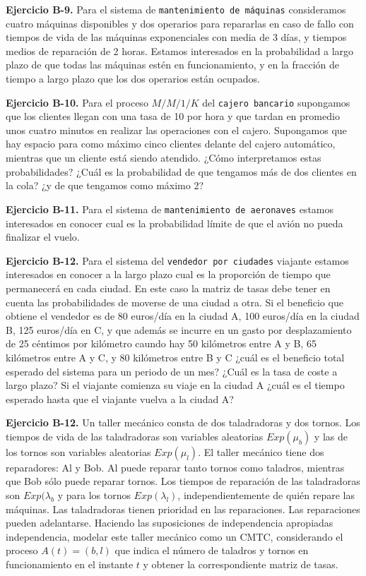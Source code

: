 \documentclass[
]{book}
\theoremstyle{definition}
\theoremstyle{definition}
\theoremstyle{definition}
\theoremstyle{definition}
\theoremstyle{remark}
\begin{document}
\textbf{Ejercicio B-9.} Para el sistema de \texttt{mantenimiento\ de\ máquinas} consideramos cuatro máquinas disponibles y dos operarios para repararlas en caso de fallo con tiempos de vida de las máquinas exponenciales con media de 3 días, y tiempos medios de reparación de 2 horas. Estamos interesados en la probabilidad a largo plazo de que todas las máquinas estén en funcionamiento, y en la fracción de tiempo a largo plazo que los dos operarios están ocupados.

\textbf{Ejercicio B-10.} Para el proceso \(M/M/1/K\) del \texttt{cajero\ bancario} supongamos que los clientes llegan con una tasa de 10 por hora y que tardan en promedio unos cuatro minutos en realizar las operaciones con el cajero. Supongamos que hay espacio para como máximo cinco clientes delante del cajero automático, mientras que un cliente está siendo atendido. ¿Cómo interpretamos estas probabilidades? ¿Cuál es la probabilidad de que tengamos más de dos clientes en la cola? ¿y de que tengamos como máximo 2?

\textbf{Ejercicio B-11.} Para el sistema de \texttt{mantenimiento\ de\ aeronaves} estamos interesados en conocer cual es la probabilidad límite de que el avión no pueda finalizar el vuelo.

\textbf{Ejercicio B-12.} Para el sistema del \texttt{vendedor\ por\ ciudades} viajante estamos interesados en conocer a la largo plazo cual es la proporción de tiempo que permanecerá en cada ciudad. En este caso la matriz de tasas debe tener en cuenta las probabilidades de moverse de una ciudad a otra. Si el beneficio que obtiene el vendedor es de 80 euros/día en la ciudad A, 100 euros/día en la ciudad B, 125 euros/día en C, y que además se incurre en un gasto por desplazamiento de 25 céntimos por kilómetro caundo hay 50 kilómetros entre A y B, 65 kilómetros entre A y C, y 80 kilómetros entre B y C ¿cuál es el beneficio total esperado del sistema para un periodo de un mes? ¿Cuál es la tasa de coste a largo plazo? Si el viajante comienza su viaje en la ciudad A ¿cuál es el tiempo esperado hasta que el viajante vuelva a la ciudad A?

\textbf{Ejercicio B-12.} Un taller mecánico consta de dos taladradoras y dos tornos. Los tiempos de vida de las taladradoras son variables aleatorias \(Exp(\mu_b)\) y las de los tornos son variables aleatorias \(Exp(\mu_l)\). El taller mecánico tiene dos reparadores: Al y Bob. Al puede reparar tanto tornos como taladros, mientras que Bob sólo puede reparar tornos. Los tiempos de reparación de las taladradoras son \(Exp(\lambda_b\) y para los tornos \(Exp(\lambda_l)\), independientemente de quién repare las máquinas. Las taladradoras tienen prioridad en las reparaciones. Las reparaciones pueden adelantarse. Haciendo las suposiciones de independencia apropiadas
independencia, modelar este taller mecánico como un CMTC, considerando el proceso \(A(t) = (b, l)\) que indica el número de taladros y tornos en funcionamiento en el instante \(t\) y obtener la correspondiente matriz de tasas.
\end{document}
